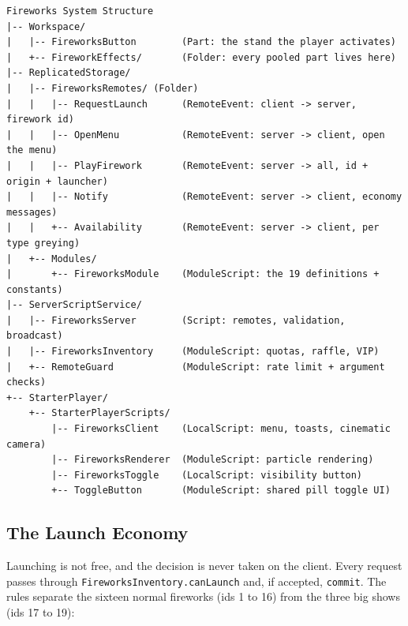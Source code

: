 \documentclass[12pt,letterpaper]{article}
\begin{document}
\begin{lstlisting}
Fireworks System Structure
|-- Workspace/
|   |-- FireworksButton        (Part: the stand the player activates)
|   +-- FireworkEffects/       (Folder: every pooled part lives here)
|-- ReplicatedStorage/
|   |-- FireworksRemotes/ (Folder)
|   |   |-- RequestLaunch      (RemoteEvent: client -> server, firework id)
|   |   |-- OpenMenu           (RemoteEvent: server -> client, open the menu)
|   |   |-- PlayFirework       (RemoteEvent: server -> all, id + origin + launcher)
|   |   |-- Notify             (RemoteEvent: server -> client, economy messages)
|   |   +-- Availability       (RemoteEvent: server -> client, per type greying)
|   +-- Modules/
|       +-- FireworksModule    (ModuleScript: the 19 definitions + constants)
|-- ServerScriptService/
|   |-- FireworksServer        (Script: remotes, validation, broadcast)
|   |-- FireworksInventory     (ModuleScript: quotas, raffle, VIP)
|   +-- RemoteGuard            (ModuleScript: rate limit + argument checks)
+-- StarterPlayer/
    +-- StarterPlayerScripts/
        |-- FireworksClient    (LocalScript: menu, toasts, cinematic camera)
        |-- FireworksRenderer  (ModuleScript: particle rendering)
        |-- FireworksToggle    (LocalScript: visibility button)
        +-- ToggleButton       (ModuleScript: shared pill toggle UI)
\end{lstlisting}

\subsection{The Launch Economy}

Launching is not free, and the decision is never taken on the client. Every request passes through \texttt{FireworksInventory.canLaunch} and, if accepted, \texttt{commit}. The rules separate the sixteen normal fireworks (ids 1 to 16) from the three big shows (ids 17 to 19):
\end{document}
